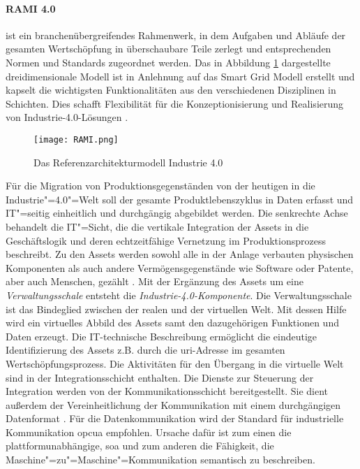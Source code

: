 \paragraph{RAMI 4.0} ist ein branchenübergreifendes Rahmenwerk, in dem Aufgaben und Abläufe der gesamten Wertschöpfung in überschaubare Teile zerlegt und entsprechenden Normen und Standards zugeordnet werden. Das in Abbildung \ref{rami} dargestellte dreidimensionale Modell ist in Anlehnung auf das Smart Grid Modell erstellt und kapselt die wichtigsten Funktionalitäten aus den verschiedenen Disziplinen in Schichten. Dies schafft Flexibilität für die Konzeptionisierung und Realisierung von Industrie-4.0-Lösungen \citep{Huebner2017}.
\begin{figure}[ht!]
  \texttt{[image: RAMI.png]}
  \caption[Das Referenzarchitekturmodell Industrie 4.0]{Das Referenzarchitekturmodell Industrie 4.0 \citep[S. 42]{BITKOM2015}}
  \label{rami}
\end{figure}
\noindent Für die Migration von Produktionsgegenständen von der heutigen in die Industrie"=4.0"=Welt soll der gesamte Produktlebenszyklus in Daten erfasst und IT"=seitig einheitlich und durchgängig abgebildet werden. Die senkrechte Achse behandelt die IT"=Sicht, die die vertikale Integration der Assets in die Geschäftslogik und deren echtzeitfähige Vernetzung im Produktionsprozess beschreibt. Zu den Assets werden sowohl alle in der Anlage verbauten physischen Komponenten als auch andere Vermögensgegenstände wie Software oder Patente, aber auch Menschen, gezählt \citep{Adolphs2017}. Mit der Ergänzung des Assets um eine \textit{Verwaltungsschale} entsteht die \textit{Industrie-4.0-Komponente}. Die Verwaltungsschale ist das Bindeglied zwischen der realen und der virtuellen Welt. Mit dessen Hilfe wird ein virtuelles Abbild des Assets samt den dazugehörigen Funktionen und Daten erzeugt. Die IT-technische Beschreibung ermöglicht die eindeutige Identifizierung des Assets z.B. durch die \ac{uri}-Adresse im gesamten Wertschöpfungsprozess. Die Aktivitäten für den Übergang in die virtuelle Welt sind in der Integrationsschicht enthalten. Die Dienste zur Steuerung der Integration werden von der Kommunikationsschicht bereitgestellt. Sie dient außerdem der Vereinheitlichung der Kommunikation mit einem durchgängigen Datenformat \citep{BITKOM2015}. Für die Datenkommunikation wird der Standard für industrielle Kommunikation \ac{opcua} empfohlen. Ursache dafür ist zum einen die plattformunabhängige, \ac{soa} und zum anderen die Fähigkeit, die Maschine"=zu"=Maschine"=Kommunikation semantisch zu beschreiben.
